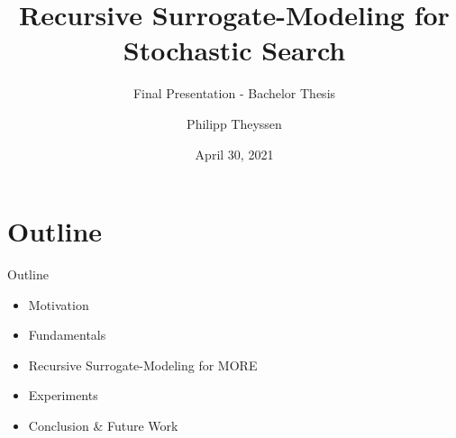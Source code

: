 \documentclass[navbarinfooter, 12pt]{sdqbeamer}
\title[Short Title]{Recursive Surrogate-Modeling for Stochastic Search}
\subtitle{Final Presentation - Bachelor Thesis}
\author{Philipp Theyssen}
\begin{document}
\date{April 30, 2021}
\KITtitleframe

\section{Outline}
\begin{frame}{Outline}
 \begin{itemize}
  \item Motivation
  \item Fundamentals
  \item Recursive Surrogate-Modeling for MORE
  \item Experiments
  \item Conclusion \& Future Work
  \end{itemize}
\end{frame}


\end{document}
